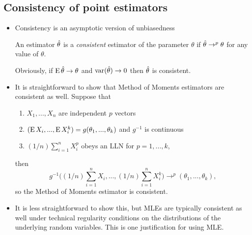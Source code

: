 \subsection{Consistency of point estimators}

\begin{itemize}[leftmargin=0pt]

\item Consistency is an asymptotic version of unbiasedness
  \begin{defn}
    An estimator $\hat{\theta}$ is a \emph{consistent} estimator of the
    parameter $\theta$ if $\hat{\theta} \to^p \theta$ for any value of $\theta$.
  \end{defn}

  Obviously, if $\operatorname{E} \hat{\theta} \to \theta$ and $\operatorname{var}(\hat{\theta}) \to 0$ then $\hat{\theta}$ is
  consistent.

\item It is straightforward to show that Method of Moments estimators
  are consistent as well.  Suppose that
  \begin{enumerate}
  \item $X_1,...,X_n$ are independent $p$ vectors
  \item $(\operatorname{E} X_i,...,\operatorname{E} X_i^k) = g(\theta_1,...,\theta_k)$ and $g^{-1}$ is
    continuous
  \item $(1/n) \sum_{i=1}^n X_i^p$ obeys an LLN for $p = 1,...,k$,
  \end{enumerate}
  then
  \begin{equation*}
    g^{-1}\Big( (1/n) \sum_{i=1}^n X_i,..., (1/n) \sum_{i=1}^n X_i^k \Big)
    \to^p (\theta_1,...,\theta_k),
  \end{equation*}
  so the Method of Moments estimator is consistent.

\item It is less straightforward to show this, but MLEs are typically
  consistent as well under technical regularity conditions on the
  distributions of the underlying random variables.  This is one
  justification for using MLE.

\end{itemize}


